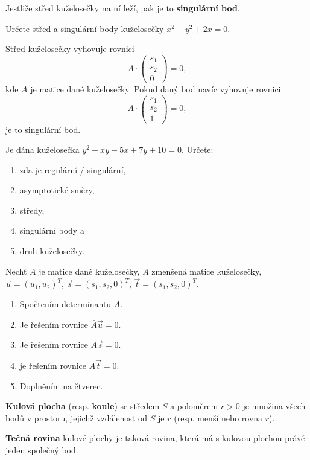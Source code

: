 \begin{definition}
    Jestliže střed kuželosečky na ní leží, pak je to \textbf{singulární bod}.
\end{definition}

\begin{priklad}
Určete střed a singulární body kuželosečky $x^2+y^2+2x=0.$
\end{priklad}

\begin{reseni}
Střed kuželosečky vyhovuje rovnici
$$A\cdot \begin{pmatrix}
    s_1 \\
    s_2\\
    0
\end{pmatrix}=0,
$$
kde $A$ je matice dané kuželosečky. Pokud daný bod navíc vyhovuje rovnici
$$A\cdot \begin{pmatrix}
    s_1 \\
    s_2\\
    1
\end{pmatrix}=0,
$$
je to singulární bod.
\end{reseni}

\begin{priklad}
Je dána kuželosečka $y^2-xy-5x+7y+10=0.$ Určete:
\begin{enumerate}[$a.$]
\item zda je regulární / singulární,
\item asymptotické směry,
\item středy,
\item singulární body a
\item druh kuželosečky.
\end{enumerate}
\end{priklad}

\begin{reseni}
Nechť $A$ je matice dané kuželosečky, $\bar{A}$ zmenšená matice kuželosečky, $\vec u=(u_1,u_2)^T$, $\vec s=(s_1,s_2,0)^T$, $\vec t=(s_1,s_2,0)^T$.
\begin{enumerate}[$a.$]
\item Spočtením determinantu $A$.
\item Je řešením rovnice $\bar A\vec u=0.$
\item Je řešením rovnice $A\vec s=0.$
\item je řešením rovnice $A\vec t = 0.$
\item Doplněním na čtverec.
\end{enumerate}
\end{reseni}

\begin{definition}
\textbf{Kulová plocha} (resp. \textbf{koule}) se středem $S$ a poloměrem $r>0$ je množina všech bodů v prostoru,
jejichž vzdálenost od $S$ je $r$ (resp. menší nebo rovna $r$).
\end{definition}

\begin{definition}
\textbf{Tečná rovina} kulové plochy je taková rovina, která má s kulovou plochou právě
jeden společný bod.
\end{definition}
